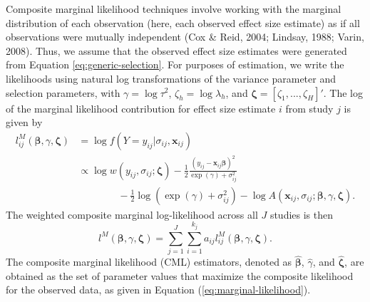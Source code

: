 \documentclass[
  american,
  man, donotrepeattitle,floatsintext]{apa7}
\begin{document}
Composite marginal likelihood techniques involve working with the marginal distribution of each observation (here, each observed effect size estimate) as if all observations were mutually independent (Cox \& Reid, 2004; Lindsay, 1988; Varin, 2008).
Thus, we assume that the observed effect size estimates were generated from Equation \eqref{eq:generic-selection}.
For purposes of estimation, we write the likelihoods using natural log transformations of the variance parameter and selection parameters, with \(\gamma = \log \tau^2\), \(\zeta_h = \log \lambda_h\), and \(\boldsymbol\zeta = \left[\zeta_1,...,\zeta_H\right]'\).
The log of the marginal likelihood contribution for effect size estimate \(i\) from study \(j\) is given by
\begin{align}
l^M_{ij}\left(\boldsymbol\beta, \gamma, \boldsymbol\zeta \right) &= \log f\left(Y = y_{ij} | \sigma_{ij}, \mathbf{x}_{ij}\right) \nonumber \\
&\propto \log w\left(y_{ij}, \sigma_{ij}; \boldsymbol\zeta \right) - \frac{1}{2} \frac{\left(y_{ij} - \mathbf{x}_{ij} \boldsymbol\beta\right)^2}{\exp(\gamma) + \sigma_{ij}^2} \nonumber\\
& \qquad \qquad  - \frac{1}{2}\log\left(\exp(\gamma) + \sigma_{ij}^2\right) - \log A\left(\mathbf{x}_{ij}, \sigma_{ij}; \boldsymbol\beta, \gamma, \boldsymbol\zeta \right). \label{eq:log-like-ij}
\end{align}
The weighted composite marginal log-likelihood across all \(J\) studies is then
\begin{equation}
\label{eq:marginal-likelihood}
l^M\left(\boldsymbol\beta, \gamma, \boldsymbol\zeta\right) = \sum_{j=1}^J \sum_{i=1}^{k_j} a_{ij} l^M_{ij}\left(\boldsymbol\beta, \gamma, \boldsymbol\zeta\right).
\end{equation}
The composite marginal likelihood (CML) estimators, denoted as \(\boldsymbol{\hat\beta}\), \(\hat\gamma\), and \(\boldsymbol{\hat\zeta}\), are obtained as the set of parameter values that maximize the composite likelihood for the observed data, as given in Equation (\ref{eq:marginal-likelihood}).
\end{document}
